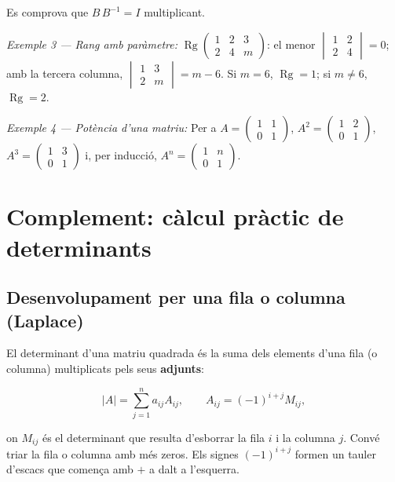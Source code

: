 Es comprova que $B\,B^{-1}=I$ multiplicant.

\emph{Exemple 3 --- Rang amb paràmetre:} $\operatorname{Rg}\begin{pmatrix}1&2&3\\2&4&m\end{pmatrix}$: el menor $\begin{vmatrix}1&2\\2&4\end{vmatrix}=0$; amb la tercera columna, $\begin{vmatrix}1&3\\2&m\end{vmatrix}=m-6$. Si $m=6$, $\operatorname{Rg}=1$; si $m\neq6$, $\operatorname{Rg}=2$.

\emph{Exemple 4 --- Potència d'una matriu:} Per a $A=\begin{pmatrix}1&1\\0&1\end{pmatrix}$, $A^2=\begin{pmatrix}1&2\\0&1\end{pmatrix}$, $A^3=\begin{pmatrix}1&3\\0&1\end{pmatrix}$ i, per inducció, $A^n=\begin{pmatrix}1&n\\0&1\end{pmatrix}$.

\section{Complement: càlcul pràctic de determinants}

\subsection{Desenvolupament per una fila o columna (Laplace)}

El determinant d'una matriu quadrada és la suma dels elements d'una fila (o columna) multiplicats pels seus \textbf{adjunts}:

\begin{equation*}
|A|=\sum_{j=1}^{n}a_{ij}A_{ij},\qquad A_{ij}=(-1)^{i+j}M_{ij},
\end{equation*}

on $M_{ij}$ és el determinant que resulta d'esborrar la fila $i$ i la columna $j$. Convé triar la fila o columna amb més zeros. Els signes $(-1)^{i+j}$ formen un tauler d'escacs que comença amb $+$ a dalt a l'esquerra.

